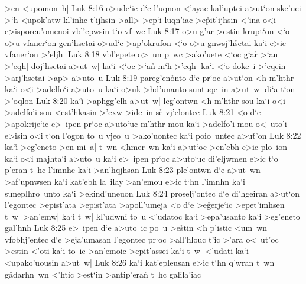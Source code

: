 >en
<upomon~h|\bibvsend
\vs Luk 8:16
o>ude`ic
d`e
l'uqnon
<'ayac
kal'uptei
a>ut`on
ske'uei
>`h
<upok'atw
kl'inhc
t'ijhsin
>all>
>ep`i
luqn'iac
>e\r{p}it'ijhsin
<'ina
o<i
e>isporeu'omenoi
vbl'epwsin
t`o
vf~wc\bibvsend
\vs Luk 8:17
o>u
g'ar
>estin
krupt`on
<`o
o>u
vfaner`on
gen'hsetai
o>ud`e
>ap'okrufon
<`o
o>u
gnwsj'h\r{s}etai
ka`i
e>ic
vfaner`on
>'eljh|\bibvsend
\vs Luk 8:18
vbl'epete
o>~un
p~wc
>ako'uete
<`oc
g`ar\r{}
>`an
>'eqh|
doj'hsetai
a>ut~w|
ka`i
<`oc
>`a\r{n}
m`h
>'eqh|
ka`i
<`o
doke~i
>'eqein
>arj'hsetai
>ap>
a>uto~u\bibvsend
\vs Luk 8:19
pareg'en\r{o}nto
d`e
pr`oc
a>ut`on
<h
m'hthr
ka`i
o<i
>adelfo`i
a>uto~u
ka`i
o>uk
>hd'unanto
suntuqe~in
a>ut~w|
di`a
t`on
>'oqlon\bibvsend
\vs Luk 8:20
ka`i\r{}
>aphgg'elh
a>ut~w|
leg'ontwn
<h
m'hthr
sou
ka`i
o<i
>adelfo'i
sou
<est'hkasin
>'exw
>ide~in
se\r{}
vj'elontec\bibvsend
\vs Luk 8:21
<o
d`e
>apokrije`ic
e>~ipen
pr`oc
a>uto`uc
m'hthr
mou
ka`i
>adelfo'i
mou
o<~uto'i
e>isin
o<i
t`on
l'ogon
to~u
vjeo~u
>ako'uontec
ka`i
poio~untec
a>u\r{t}'on\bibvsend
{}
\vs Luk 8:22
ka`i\r{}
>eg'eneto
>en
mi~a|
t~wn
<hmer~wn
ka`i
a>ut`oc
>en'ebh
e>ic
plo~ion
ka`i
o<i
majhta`i
a>uto~u
ka`i
e>~ipen
pr`oc
a>uto`uc
di'eljwmen
e>ic
t`o
p'eran
t~hc
l'imnhc
ka`i
>an'hqjhsan\bibvsend
\vs Luk 8:23
ple'ontwn
d`e
a>ut~wn
>af'upnwsen
ka`i
kat'ebh
la~ilay
>an'emou
e>ic
t`hn
l'imnhn
ka`i
suneplhro~unto
ka`i
>ekind'uneuon\bibvsend
\vs Luk 8:24
proselj'ontec
d`e
di'hgeiran
a>ut`on
l'egontec
>epist'ata
>epist'ata
>apoll'umeja
<o
d`e
>e\r{g}erje`ic
>epet'imhsen
t~w|
>an'emw|
ka`i
t~w|
kl'udwni
to~u
<'udatoc
ka`i
>epa'usanto
ka`i
>eg'eneto
gal'hnh\bibvsend
\vs Luk 8:25
e>~ipen
d`e
a>uto~ic
po~u
>e\r{s}tin
<h
p'istic
<um~wn
vfobhj'entec
d`e
>eja'umasan
l'egontec
pr`oc
>all'hlouc
t'ic
>'ara
o<~ut'oc
>estin
<'oti
ka`i
to~ic
>an'emoic
>epit'assei
ka`i
t~w|
<'udati
ka`i
<upako'uousin
a>ut~w|\bibvsend
\vs Luk 8:26
ka`i
kat'epleusan
e>ic
t`hn
q'wran
t~wn
g\r{a}darhn~wn
<'htic
>est`in
>antip'era\r{n}
t~hc
galila'iac\bibvsend
